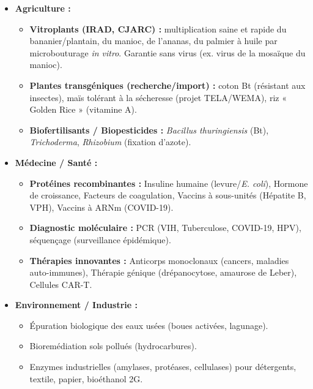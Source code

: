 \documentclass[11pt]{article}
\begin{document}
\begin{exemplebox}
\begin{itemize}
    \item \textbf{Agriculture :}
    \begin{itemize}
        \item \textbf{Vitroplants (IRAD, CJARC) :} multiplication saine et rapide du bananier/plantain, du manioc, de l'ananas, du palmier à huile par microbouturage \textit{in vitro}. Garantie sans virus (ex. virus de la mosaïque du manioc).
        \item \textbf{Plantes transgéniques (recherche/import) :} coton Bt (résistant aux insectes), maïs tolérant à la sécheresse (projet TELA/WEMA), riz « Golden Rice » (vitamine A).
        \item \textbf{Biofertilisants / Biopesticides :} \emph{Bacillus thuringiensis} (Bt), \emph{Trichoderma}, \emph{Rhizobium} (fixation d'azote).
    \end{itemize}
    \item \textbf{Médecine / Santé :}
    \begin{itemize}
        \item \textbf{Protéines recombinantes :} Insuline humaine (levure/\emph{E. coli}), Hormone de croissance, Facteurs de coagulation, Vaccins à sous-unités (Hépatite B, VPH), Vaccins à ARNm (COVID-19).
        \item \textbf{Diagnostic moléculaire :} PCR (VIH, Tuberculose, COVID-19, HPV), séquençage (surveillance épidémique).
        \item \textbf{Thérapies innovantes :} Anticorps monoclonaux (cancers, maladies auto-immunes), Thérapie génique (drépanocytose, amaurose de Leber), Cellules CAR-T.
    \end{itemize}
    \item \textbf{Environnement / Industrie :}
    \begin{itemize}
        \item Épuration biologique des eaux usées (boues activées, lagunage).
        \item Bioremédiation sols pollués (hydrocarbures).
        \item Enzymes industrielles (amylases, protéases, cellulases) pour détergents, textile, papier, bioéthanol 2G.
    \end{itemize}
\end{itemize}
\end{exemplebox}
\end{document}
